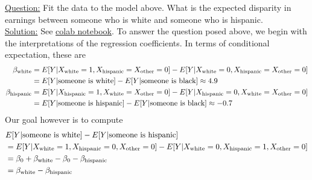\begin{itemize}
\begin{example}
\noindent
\underline{Question:} Fit the data to the model above. What is the expected disparity in earnings between someone who is white and someone who is hispanic. \\

\noindent
\underline{Solution:} 
See \href{https://colab.research.google.com/drive/1oIRgP_7-c5DGV1D2iz5nj406mZfJxUIG?usp=sharing}{colab notebook}. To answer the question posed above, we begin with the interpretations of the regression coefficients. In terms of conditional expectation, these are
\begin{align*}
\beta_{\rm white} &= E[Y|X_{\rm white}=1,X_{\rm hispanic}=X_{\rm other}=0]- E[Y|X_{\rm white}=0,X_{\rm hispanic}=X_{\rm other}=0]\\
&= E[Y|\text{someone is white}]- E[Y|\text{someone is black}] \approx 4.9\\
\beta_{\rm hispanic} &= E[Y|X_{\rm hispanic}=1,X_{\rm white}=X_{\rm other}=0]- E[Y|X_{\rm hispanic}=0,X_{\rm white}=X_{\rm other}=0]\\
&= E[Y|\text{someone is hispanic}]- E[Y|\text{someone is black}]\approx -0.7\\
\end{align*}
Our goal however is to compute 
\begin{align*}
&E[Y|\text{someone is white}]-E[Y|\text{someone is hispanic}] \\
&= E[Y|X_{\rm white}=1,X_{\rm hispanic}=0,X_{\rm other}=0 ]
-E[Y|X_{\rm white}=0,X_{\rm hispanic}=1,X_{\rm other}=0 ]\\
&= \beta_0 + \beta_{\rm white} - \beta_0 - \beta_{\rm hispanic}\\
& = \beta_{\rm white} - \beta_{\rm hispanic}
\end{align*}



\end{example}


\end{itemize}

 





